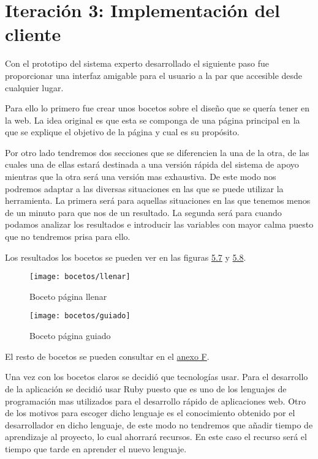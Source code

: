 \section{Iteración 3: Implementación del cliente}


Con el prototipo del sistema experto desarrollado el siguiente paso fue
proporcionar una interfaz amigable para el usuario a la par que accesible
desde cualquier lugar.

Para ello lo primero fue crear unos bocetos sobre el diseño que se quería tener
en la web. La idea original es que esta se componga de una página
principal en la que se explique el objetivo de la página y cual es su propósito.

Por otro lado tendremos dos secciones que se diferencien la una de la otra, de las
cuales una de ellas estará destinada a una versión rápida del sistema de apoyo mientras
que la otra será una versión mas exhaustiva. De este modo nos podremos adaptar
a las diversas situaciones en las que se puede utilizar la herramienta.
La primera será para aquellas situaciones en las que tenemos menos de un minuto
para que nos de un resultado. La segunda será para cuando podamos analizar
los resultados e introducir las variables con mayor calma puesto que no
tendremos prisa para ello.

Los resultados los bocetos se pueden ver en las figuras \hyperref[fig:Boceto página llenar]{5.7} y \hyperref[fig:Boceto página guiado]{5.8}.

\begin{figure}[htb]
  \centering
    \texttt{[image: bocetos/llenar]}
  \caption[Boceto página llenar]{Boceto página llenar}
  \label{fig:Boceto página llenar}
\end{figure}

\begin{figure}[htb]
  \centering
    \texttt{[image: bocetos/guiado]}
  \caption[Boceto página guiado]{Boceto página guiado}
  \label{fig:Boceto página guiado}
\end{figure}

El resto de bocetos se pueden consultar en el \hyperref[cap:Bocetos]{anexo F}.

Una vez con los bocetos claros se decidió que tecnologías usar. Para el desarrollo
de la aplicación se decidió usar Ruby puesto que es uno de los lenguajes
de programación mas utilizados para el desarrollo rápido de aplicaciones web.
Otro de los motivos para escoger dicho lenguaje es el conocimiento obtenido
por el desarrollador en dicho lenguaje, de este modo no tendremos que añadir
tiempo de aprendizaje al proyecto, lo cual ahorrará recursos. En este caso el
recurso será el tiempo que tarde en aprender el nuevo lenguaje.

